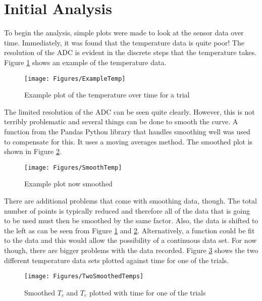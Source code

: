 \section{Initial Analysis}
To begin the analysis, simple plots were made to look at the sensor data over time. Immediately, it was found that the temperature data is quite poor! The resolution of the ADC is evident in the discrete steps that the temperature takes. Figure \ref{fig:BadTemp} shows an example of the temperature data.
\begin{figure}[h!]
\centering
\texttt{[image: Figures/ExampleTemp]}
\caption{Example plot of the temperature over time for a trial}
\label{fig:BadTemp}
\end{figure}
The limited resolution of the ADC can be seen quite clearly. However, this is not terribly problematic and several things can be done to smooth the curve. A function from the Pandas Python library that handles smoothing well was used to compensate for this. It uses a moving averages method. The smoothed plot is shown in Figure \ref{fig:SmoothedTemp}.
\begin{figure}[h!]
\centering
\texttt{[image: Figures/SmoothTemp]}
\caption{Example plot now smoothed}
\label{fig:SmoothedTemp}
\end{figure}
There are additional problems that come with smoothing data, though. The total number of points is typically reduced and therefore all of the data that is going to be used must then be smoothed by the same factor. Also, the data is shifted to the left as can be seen from Figure \ref{fig:BadTemp} and \ref{fig:SmoothedTemp}. Alternatively, a function could be fit to the data and this would allow the possibility of a continuous data set. For now though, there are bigger problems with the data recorded. Figure \ref{fig:BothTemps} shows the two different temperature data sets plotted against time for one of the trials. 
\begin{figure}[h!]
\centering
\texttt{[image: Figures/TwoSmoothedTemps]}
\caption{Smoothed $T_c$ and $T_e$ plotted with time for one of the trials}
\label{fig:BothTemps}
\end{figure}
